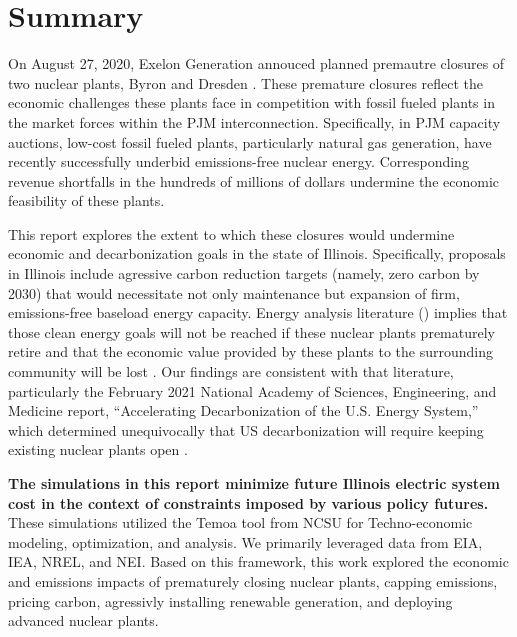\section{Summary}
On August 27, 2020, Exelon Generation annouced planned premautre closures of two nuclear plants, 
Byron and Dresden \cite{larson_exelon_2020}. These premature closures reflect 
the economic challenges these plants face in competition with fossil fueled 
plants in the market forces within the PJM interconnection. Specifically, in PJM capacity 
auctions,  low-cost fossil fueled plants, particularly natural gas generation, 
have recently successfully underbid emissions-free nuclear energy. 
Corresponding revenue shortfalls in the hundreds of millions of dollars
undermine the economic feasibility of these plants. 

This report explores the extent to which these closures would undermine 
economic and decarbonization goals in the state of Illinois.  Specifically, 
proposals in Illinois include agressive carbon reduction targets (namely, zero carbon by 2030) 
that would necessitate not only maintenance but expansion of firm, 
emissions-free baseload energy capacity. Energy analysis literature 
(\cite{national_accelerating_2021,larson_net-zero_2020,others}) implies that those clean energy 
goals will not be reached if these nuclear plants prematurely retire and that 
the economic value provided by these plants to the surrounding community will 
be lost \cite{economic_impact_studies}. 
Our findings are consistent with that literature, particularly the February 
2021 National Academy of Sciences, Engineering, and Medicine report, 
``Accelerating Decarbonization of the U.S. Energy System,'' which determined 
unequivocally that US decarbonization will require keeping existing nuclear 
plants open \cite{national_accelerating_2021}.

\textbf{The simulations in this report minimize future Illinois electric system cost 
in the context of constraints imposed by various policy futures.} These simulations utilized the 
Temoa tool from \gls{NCSU} for Techno-economic modeling, optimization, and 
analysis. We primarily leveraged data from \gls{EIA}, \gls{IEA}, 
\gls{NREL}, and \gls{NEI}. Based on this framework, this work explored the economic 
and emissions impacts of prematurely closing nuclear plants, capping 
emissions, pricing carbon, agressivly installing renewable generation, and deploying advanced nuclear plants.

